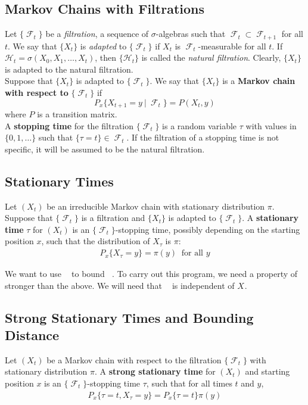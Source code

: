 \documentclass[12pt]{article}
\DeclareMathOperator*{\mix}{t_{\text{mix}}}
\DeclareMathOperator*{\ttop}{\tau_{\text{top}}}
\DeclareMathOperator*{\F}{\mathcal{F}}
\begin{document}
\subsection{Markov Chains with Filtrations}

Let $\{\F_t\}$ be a \textit{filtration}, a sequence of $\sigma$-algebras such that $\F_t \subset \F_{t+1}$ for all $t$. We say that $\{X_t\}$ is \textit{adapted} to $\{\F_t\}$ if $X_t$ is $\F_t$-measurable for all $t$. If $\mathcal{H}_t = \sigma(X_0, X_1, \ldots, X_t)$, then $\{\mathcal{H}_t\}$ is called the \textit{natural filtration}. Clearly, $\{X_t\}$ is adapted to the natural filtration.\\

Suppose that $\{X_t\}$ is adapted to $\{\F_t\}$. We say that $\{X_t\}$ is a \textbf{Markov chain with respect to} $\{ \F_t\}$ if $$P_x\{X_{t+1} = y \ | \ \F_t\} = P(X_t, y)$$ where $P$ is a transition matrix.\\

A \textbf{stopping time} for the filtration $\{\F_t\}$ is a random variable $\tau$ with values in $\{0, 1, \ldots\}$ such that $\{\tau = t\} \in \F_t$. If the filtration of a stopping time is not specific, it will be assumed to be the natural filtration.

\subsection{Stationary Times}

Let $(X_t)$ be an irreducible Markov chain with stationary distribution $\pi$. Suppose that $\{\F_t\}$ is a filtration and $\{X_t\}$ is adapted to $\{\F_t\}$. A \textbf{stationary time} $\tau$ for $(X_t)$ is an $\{\F_t\}$-stopping time, possibly depending on the starting position $x$, such that the distribution of $X_{\tau}$ is $\pi$:
\begin{align*}
P_x \{X_{\tau} = y \} = \pi(y) \; \; \text{for all } y
\end{align*}

We want to use $\ttop$ to bound $\mix$. To carry out this program, we need a property of $\ttop$ stronger than the above. We will need that $\ttop$ is independent of $X_{\ttop}$.

\subsection{Strong Stationary Times and Bounding Distance}

Let $(X_t)$ be a Markov chain with respect to the filtration $\{\F_t\}$ with stationary distribution $\pi$. A \textbf{strong stationary time} for $(X_t)$ and starting position $x$ is an $\{\F_t\}$-stopping time $\tau$, such that for all times $t$ and $y$,
\begin{align*}
P_x\{ \tau = t, X_{\tau} = y\} = P_x\{\tau = t\} \pi(y)
\end{align*}
\end{document}
